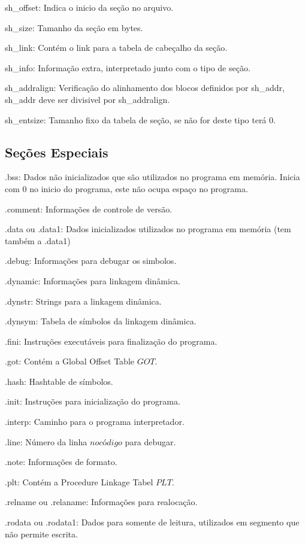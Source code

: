    sh\_offset: Indica o inicio da seção no arquivo.
   
   sh\_size: Tamanho da seção em bytes.
   
   sh\_link: Contém o link para a tabela de cabeçalho da seção.
   
   sh\_info: Informação extra, interpretado junto com o tipo de seção.
   
   sh\_addralign: Verificação do alinhamento dos blocos definidos por sh\_addr, sh\_addr deve ser divisivel por sh\_addralign.


   sh\_entsize: Tamanho fixo da tabela de seção, se não for deste tipo terá 0.

\subsection {Seções Especiais}
   .bss: Dados não inicializados que são utilizados no programa em memória. Inicia com 0 no inicio do programa, este não ocupa espaço no programa.
   
   .comment: Informações de controle de versão.

   .data ou .data1: Dados inicializados utilizados no programa em memória (tem também a .data1)

   .debug: Informações para debugar os simbolos.
   
   .dynamic: Informações para linkagem dinâmica.
   
   .dynstr: Strings para a linkagem dinâmica.
   
   .dynsym: Tabela de símbolos da linkagem dinâmica.

   .fini: Instruções executáveis para finalização do programa.

   .got: Contém a Global Offset Table \(GOT\).

   .hash: Hashtable de símbolos.

   .init: Instruções para inicialização do programa.

   .interp: Caminho para o programa interpretador.

   .line: Número da linha \(no código\) para debugar.
   
   .note: Informações de formato.
   
   .plt: Contém a Procedure Linkage Tabel \(PLT\).

   .relname ou .relaname: Informações para realocação.

   .rodata ou .rodata1: Dados para somente de leitura, utilizados em segmento que não permite escrita.

